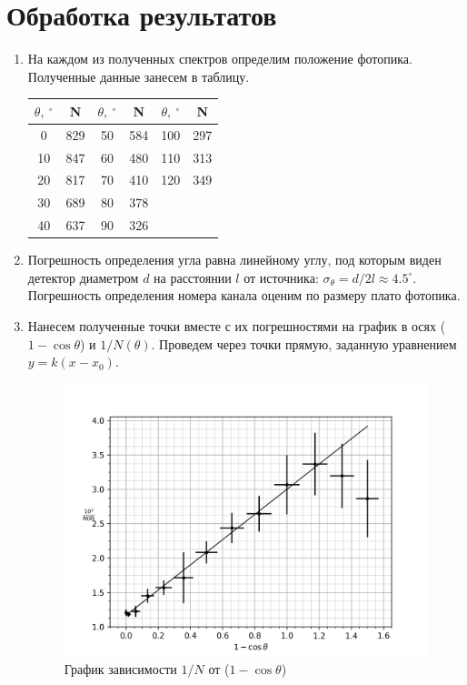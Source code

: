 \documentclass[14pt, a4paper]{report}
\begin{document}
\begin{enumerate}
\newpage

\end{enumerate}

\section{Обработка результатов}

\begin{enumerate}

\item На каждом из полученных спектров определим положение фотопика. Полученные данные занесем в таблицу.

\begin{table}[H]
\centering
\begin{tabular}{|c|c|c|c|c|c|}
\hline
$\theta,\ ^\circ$  & N   & $\theta,\ ^\circ$  & N   & $\theta,\ ^\circ$   & N   \\ \hline
0  & 829 & 50 & 584 & 100 & 297 \\
10 & 847 & 60 & 480 & 110 & 313 \\
20 & 817 & 70 & 410 & 120 & 349 \\
30 & 689 & 80 & 378 &     &     \\
40 & 637 & 90 & 326 &     &     \\ \hline
\end{tabular}
\end{table}

\item Погрешность определения угла равна линейному углу, под которым виден детектор диаметром $d$ на расстоянии $l$ от источника: $\sigma_\theta=d/2l\approx4.5^\circ$. Погрешность  определения номера канала оценим по размеру плато фотопика.

\item Нанесем полученные точки вместе с их погрешностями на график в осях ($1-\cos{\theta}$) и $1/N(\theta)$. Проведем через точки прямую, заданную уравнением $y=k(x-x_0)$.

\begin{figure}[H]
\centering
\includegraphics[width=0.7\linewidth]{../images/512-2}
\caption{График зависимости $1/N$ от ($1-\cos{\theta}$)}
\end{figure}


\end{enumerate}
\end{document}
